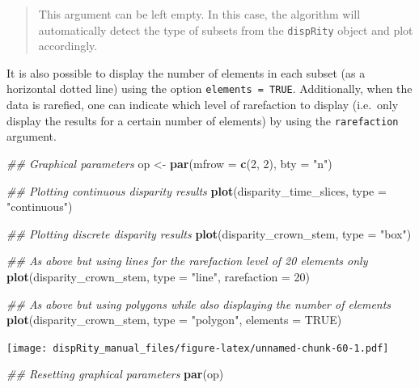 \documentclass[]{book}
\newenvironment{Shaded}{\begin{snugshade}}{\end{snugshade}}
\newcommand{\CommentTok}[1]{\textcolor[rgb]{0.56,0.35,0.01}{\textit{#1}}}
\newcommand{\DataTypeTok}[1]{\textcolor[rgb]{0.13,0.29,0.53}{#1}}
\newcommand{\DecValTok}[1]{\textcolor[rgb]{0.00,0.00,0.81}{#1}}
\newcommand{\KeywordTok}[1]{\textcolor[rgb]{0.13,0.29,0.53}{\textbf{#1}}}
\newcommand{\NormalTok}[1]{#1}
\newcommand{\OtherTok}[1]{\textcolor[rgb]{0.56,0.35,0.01}{#1}}
\newcommand{\StringTok}[1]{\textcolor[rgb]{0.31,0.60,0.02}{#1}}
\begin{document}
\begin{quote}
This argument can be left empty. In this case, the algorithm will automatically detect the type of subsets from the \texttt{dispRity} object and plot accordingly.
\end{quote}

It is also possible to display the number of elements in each subset (as a horizontal dotted line) using the option \texttt{elements\ =\ TRUE}.
Additionally, when the data is rarefied, one can indicate which level of rarefaction to display (i.e.~only display the results for a certain number of elements) by using the \texttt{rarefaction} argument.

\begin{Shaded}
\begin{Highlighting}[]
\CommentTok{## Graphical parameters}
\NormalTok{op <-}\StringTok{ }\KeywordTok{par}\NormalTok{(}\DataTypeTok{mfrow =} \KeywordTok{c}\NormalTok{(}\DecValTok{2}\NormalTok{, }\DecValTok{2}\NormalTok{), }\DataTypeTok{bty =} \StringTok{"n"}\NormalTok{)}

\CommentTok{## Plotting continuous disparity results}
\KeywordTok{plot}\NormalTok{(disparity_time_slices, }\DataTypeTok{type =} \StringTok{"continuous"}\NormalTok{)}

\CommentTok{## Plotting discrete disparity results}
\KeywordTok{plot}\NormalTok{(disparity_crown_stem, }\DataTypeTok{type =} \StringTok{"box"}\NormalTok{)}

\CommentTok{## As above but using lines for the rarefaction level of 20 elements only}
\KeywordTok{plot}\NormalTok{(disparity_crown_stem, }\DataTypeTok{type =} \StringTok{"line"}\NormalTok{, }\DataTypeTok{rarefaction =} \DecValTok{20}\NormalTok{)}

\CommentTok{## As above but using polygons while also displaying the number of elements}
\KeywordTok{plot}\NormalTok{(disparity_crown_stem, }\DataTypeTok{type =} \StringTok{"polygon"}\NormalTok{, }\DataTypeTok{elements =} \OtherTok{TRUE}\NormalTok{)}
\end{Highlighting}
\end{Shaded}

\texttt{[image: dispRity\_manual\_files/figure-latex/unnamed-chunk-60-1.pdf]}

\begin{Shaded}
\begin{Highlighting}[]
\CommentTok{## Resetting graphical parameters}
\KeywordTok{par}\NormalTok{(op)}
\end{Highlighting}
\end{Shaded}
\end{document}
